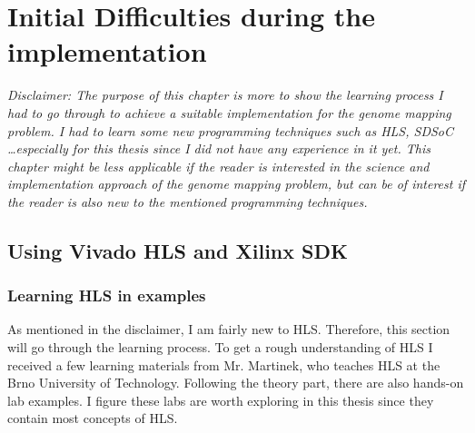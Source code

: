 
\chapter{Initial Difficulties during the implementation}

\textit{Disclaimer: The purpose of this chapter is more to show the learning process I had to go through to achieve a suitable implementation for the genome mapping problem. I had to learn some new programming techniques such as HLS, SDSoC \dots especially for this thesis since I did not have any experience in it yet. This chapter might be less applicable if the reader is interested in the science and implementation approach of the genome mapping problem, but can be of interest if the reader is also new to the mentioned programming techniques.}

\section{Using Vivado HLS and Xilinx SDK}

\subsection{Learning HLS in examples}
\label{HLS}

As mentioned in the disclaimer, I am fairly new to HLS. Therefore, this section will go through the learning process. To get a rough understanding of HLS I received a few learning materials from Mr. Martinek, who teaches HLS at the Brno University of Technology. Following the theory part,  there are also hands-on lab examples. I figure these labs are worth exploring in this thesis since they contain most concepts of HLS.


